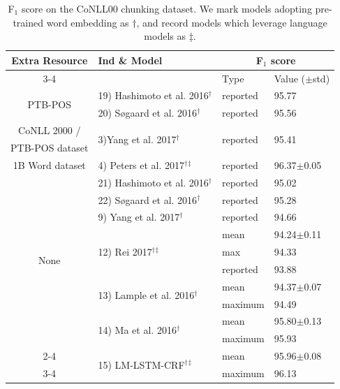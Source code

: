 \documentclass[letterpaper]{article} %
\newcommand{\our}{\textsc{LM-LSTM-CRF}\xspace}
\newcommand{\sbef}{}
\begin{document}
\begin{table}
\center
\scalebox{0.7}
{
\begin{tabular}{c||l|l|l}
\hline
\multirow{2}{*}{Extra Resource} & \multirow{2}{*}{Ind \& Model} & \multicolumn{2}{|c}{F$_1$ score}\\
\cline{3-4}
 & & Type & Value ($\pm$std)\\
\hline
\hline
\multirow{2}{*}{PTB-POS} & \nocite{hashimoto2016joint}19) Hashimoto et al. 2016$^\dagger$ & reported& 95.77\\
\cline{2-4}
& \nocite{sogaard2016deep}20) S{\o}gaard et al. 2016$^\dagger$& reported & 95.56 \\
\hline
CoNLL 2000 / & \multirow{2}{*}{3)Yang et al. 2017$^\dagger$} & \multirow{2}{*}{reported} & \multirow{2}{*}{95.41} \\
PTB-POS dataset & & & \\
\hline
1B Word dataset &4) Peters et al. 2017$^\dagger$$^\ddagger$ & reported & 96.37$\pm$0.05 \\
\hline
\hline
\multirow{10}{*}{None} & \nocite{hashimoto2016joint}21) Hashimoto et al. 2016$^\dagger$ & reported& 95.02 \\
\cline{2-4}
& \nocite{sogaard2016deep}22) S{\o}gaard et al. 2016$^\dagger$& reported & 95.28 \\
\cline{2-4}
&9) Yang et al. 2017$^\dagger$ & reported & 94.66\\
\cline{2-4}
& \multirow{3}{*}{12) Rei 2017$^\dagger$$^\ddagger$} & mean & 94.24$\pm$0.11\\
\cline{3-4}
& & max & 94.33\\
\cline{3-4}
& & reported & 93.88\\
\cline{2-4}
& \multirow{2}{*}{13) Lample et al. 2016$^\dagger$} & mean & 94.37$\pm$0.07\\
\cline{3-4}
& & maximum & 94.49\\
\cline{2-4}
& \multirow{2}{*}{14) Ma et al. 2016$^\dagger$} & mean & 95.80$\pm$0.13\\
\cline{3-4}
& & maximum & 95.93\\
\cline{2-4}
& \multirow{2}{*}{15) \our$^\dagger$$^\ddagger$} & mean & 95.96$\pm$0.08\\
\cline{3-4}
& & maximum & 96.13\\
\hline
\end{tabular}
}
\caption{F$_1$ score on the CoNLL00 chunking dataset. 
We mark models adopting pre-trained word embedding as $\dagger$, and record models which leverage language models as $\ddagger$.
}\label{tbl:chunking}
\end{table}
\end{document}
